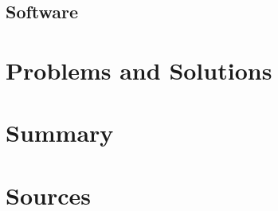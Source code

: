 \documentclass{article}
\begin{document}
\subsection{Software}

\section{Problems and Solutions}

\section{Summary}

\section{Sources}





\end{document}
